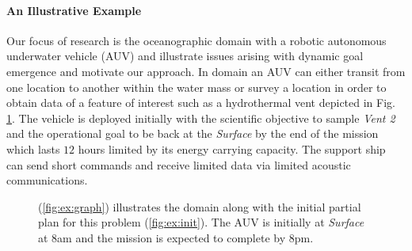 \paragraph{An Illustrative Example} 
Our focus of research is the oceanographic domain with a robotic
autonomous underwater vehicle (AUV) and illustrate issues arising with
dynamic goal emergence and motivate our approach.  In domain an AUV
can either transit from one location to another within the water mass
or survey a location in order to obtain data of a feature of interest
such as a hydrothermal vent depicted in Fig. \ref{fig:Example}.  The
vehicle is deployed initially with the scientific objective to sample
{\em Vent 2} and the operational goal to be back at the {\em Surface}
by the end of the mission which lasts $12$ hours limited by its energy
carrying capacity. The support ship can send short commands and
receive limited data via limited acoustic communications.

\begin{figure}[!t]
  \centering
  \hfill {}
  \caption{\small{(\ref{fig:ex:graph}) illustrates the domain along
      with the initial partial plan for this problem
      (\ref{fig:ex:init}). The AUV is initially at {\em Surface} at
      $8$am and the mission is expected to complete by $8$pm.}}
\label{fig:Example}
\end{figure}

